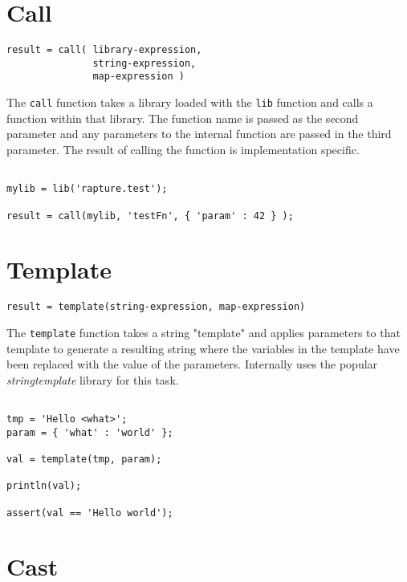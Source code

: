\section{Call}

\begin{Verbatim}
result = call( library-expression,
               string-expression,
               map-expression )
\end{Verbatim}

The \Verb+call+ function takes a library loaded with the \verb+lib+ function and calls a function within that library. The function name is passed as the second parameter and any parameters to the internal function are passed in the third parameter. The result of calling the function is implementation specific.

\begin{lstlisting}[caption={Call example}]

mylib = lib('rapture.test');

result = call(mylib, 'testFn', { 'param' : 42 } );

\end{lstlisting}

\section{Template}

\begin{Verbatim}
result = template(string-expression, map-expression)
\end{Verbatim}

The \Verb+template+ function takes a string "template" and applies parameters to that template to generate a resulting string where the variables in the template have been replaced with the value of the parameters. Internally \Reflex uses the popular \emph{stringtemplate} library for this task.

\begin{lstlisting}[caption={Template example}]

tmp = 'Hello <what>';
param = { 'what' : 'world' };

val = template(tmp, param);

println(val);

assert(val == 'Hello world');

\end{lstlisting}

\section{Cast}

